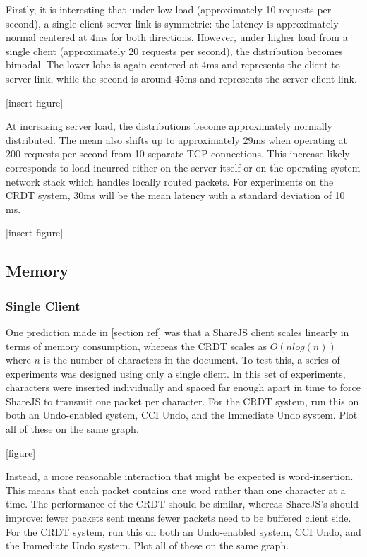 \documentclass[12pt,a4paper,twoside,openright]{report}
\begin{document}
			Firstly, it is interesting that under low load (approximately 10 requests per second), a single client-server link is symmetric: the latency is approximately normal centered at 4ms for both directions. However, under higher load from a single client (approximately 20 requests per second), the distribution becomes bimodal. The lower lobe is again centered at 4ms and represents the client to server link, while the second is around 45ms and represents the server-client link.
			
			[insert figure]
			
			At increasing server load, the distributions become approximately normally distributed. The mean also shifts up to approximately 29ms when operating at 200 requests per second from 10 separate TCP connections. This increase likely corresponds to load incurred either on the server itself or on the operating system network stack which handles locally routed packets. For experiments on the CRDT system, 30ms will be the mean latency with a standard deviation of 10 ms.
			
			[insert figure]
			
		\subsection{Memory}
		
			\subsubsection{Single Client}
				One prediction made in [section ref] was that a ShareJS client scales linearly in terms of memory consumption, whereas the CRDT scales as $O(nlog(n))$ where $n$ is the number of characters in the document. To test this, a series of experiments was designed using only a single client. In this set of experiments, characters were inserted individually and spaced far enough apart in time to force ShareJS to transmit one packet per character. For the CRDT system, run this on both an Undo-enabled system, CCI Undo, and the Immediate Undo system. Plot all of these on the same graph.
				
				[figure]
				
				Instead, a more reasonable interaction that might be expected is word-insertion. This means that each packet contains one word rather than one character at a time. The performance of the CRDT should be similar, whereas ShareJS's should improve: fewer packets sent means fewer packets need to be buffered client side. For the CRDT system, run this on both an Undo-enabled system, CCI Undo, and the Immediate Undo system. Plot all of these on the same graph.
				
\end{document}
